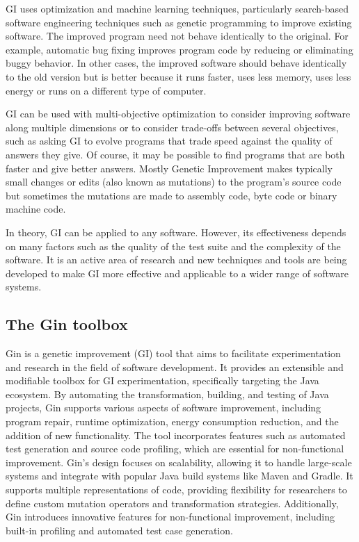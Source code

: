 GI uses optimization and machine learning techniques, particularly search-based software engineering techniques such as genetic programming to improve existing software. The improved program need not behave identically to the original. For example, automatic bug fixing improves program code by reducing or eliminating buggy behavior. In other cases, the improved software should behave identically to the old version but is better because it runs faster, uses less memory, uses less energy or runs on a different type of computer.\par

GI can be used with multi-objective optimization to consider improving software along multiple dimensions or to consider trade-offs between several objectives, such as asking GI to evolve programs that trade speed against the quality of answers they give. Of course, it may be possible to find programs that are both faster and give better answers. Mostly Genetic Improvement makes typically small changes or edits (also known as mutations) to the program's source code but sometimes the mutations are made to assembly code, byte code or binary machine code.\par

In theory, GI can be applied to any software. However, its effectiveness depends on many factors such as the quality of the test suite and the complexity of the software. It is an active area of research and new techniques and tools are being developed to make GI more effective and applicable to a wider range of software systems.\par

\subsection{The Gin toolbox}

\setlength{\parskip}{5pt}
Gin is a genetic improvement (GI) tool that aims to facilitate experimentation and research in the field of software development. It provides an extensible and modifiable toolbox for GI experimentation, specifically targeting the Java ecosystem. By automating the transformation, building, and testing of Java projects, Gin supports various aspects of software improvement, including program repair, runtime optimization, energy consumption reduction, and the addition of new functionality. The tool incorporates features such as automated test generation and source code profiling, which are essential for non-functional improvement. Gin's design focuses on scalability, allowing it to handle large-scale systems and integrate with popular Java build systems like Maven and Gradle. It supports multiple representations of code, providing flexibility for researchers to define custom mutation operators and transformation strategies. Additionally, Gin introduces innovative features for non-functional improvement, including built-in profiling and automated test case generation.\par

